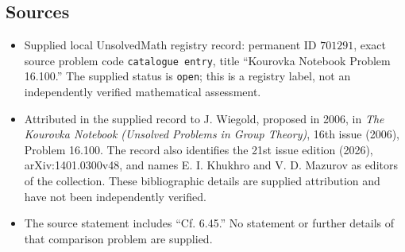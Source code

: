 \documentclass[11pt]{article}
\begin{document}
\subsection{Sources}
\begin{itemize}
\item Supplied local UnsolvedMath registry record: permanent ID \(701291\), exact source problem code \texttt{catalogue entry}, title ``Kourovka Notebook Problem 16.100.'' The supplied status is \texttt{open}; this is a registry label, not an independently verified mathematical assessment.
\item Attributed in the supplied record to J. Wiegold, proposed in 2006, in \emph{The Kourovka Notebook (Unsolved Problems in Group Theory)}, 16th issue (2006), Problem 16.100. The record also identifies the 21st issue edition (2026), arXiv:1401.0300v48, and names E. I. Khukhro and V. D. Mazurov as editors of the collection. These bibliographic details are supplied attribution and have not been independently verified.
\item The source statement includes ``Cf. 6.45.'' No statement or further details of that comparison problem are supplied.
\end{itemize}
\end{document}
